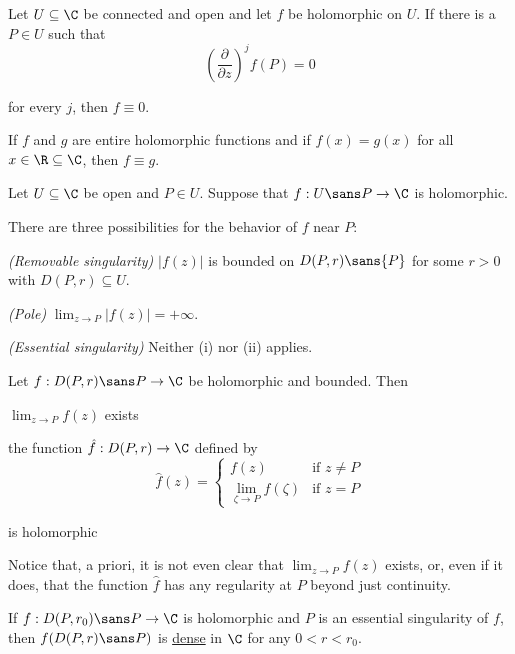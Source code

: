 Let $U\subseteq\C$ be connected and open and let $f$ be holomorphic on $U$. If
there is a $P\in U$ such that
$$
  \left(\frac\partial{\partial z}\right)^jf(P)=0
$$

for every $j$, then $f\equiv0$.

\label{bd8ae3b}

If $f$ and $g$ are entire holomorphic functions and if $f(x)=g(x)$ for all
$x\in\R\subseteq\C$, then $f\equiv g$.

\label{a7f062e}

Let $U\subseteq\C$ be open and $P\in U$. Suppose that $f:U\sans P\to\C$ is
holomorphic.

There are three possibilities for the behavior of $f$ near $P$:
\begin{enumerati}
  \item \textit{(Removable singularity)} $|f(z)|$ is bounded on $D(P,r)\sans{P}$
  for some $r>0$ with $D(P,r)\subseteq U$.
  \item \textit{(Pole)} $\lim_{z\to P}|f(z)|=+\infty$.
  \item \textit{(Essential singularity)} Neither (i) nor (ii) applies.
\end{enumerati}

\label{f42a663}

Let $f:D(P,r)\sans P\to\C$ be holomorphic and bounded. Then
\begin{enumerata}
  \item $\lim_{z\to P}f(z)$ exists
  \item the function $\hat f:D(P,r)\to\C$ defined by
  $$
    \hat f(z)=\begin{cases}
      f(z)                                   & \text{if }z\neq P \\
      \displaystyle\lim_{\zeta\to P}f(\zeta) & \text{if }z=P
    \end{cases}
  $$

  is holomorphic
\end{enumerata}

Notice that, a priori, it is not even clear that $\lim_{z\to P}f(z)$ exists,
or, even if it does, that the function $\hat f$ has any regularity at $P$
beyond just continuity.

\label{da8365b}

If $f:D(P,r_0)\sans P\to\C$ is holomorphic and $P$ is an essential singularity
of $f$, then $f(D(P,r)\sans P)$ is \href{e14819a}{dense} in $\C$ for any
$0<r<r_0$.

